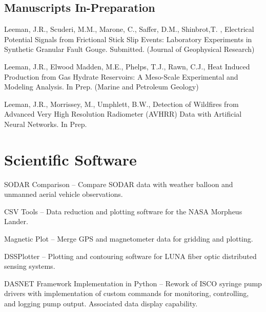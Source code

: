 \documentclass[letterpaper]{article}
\renewenvironment{itemize}{
  \begin{list}{}{
    \setlength{\leftmargin}{1.5em}
  }
}{
  \end{list}
}
\begin{document}
\subsection*{Manuscripts In-Preparation}
\begin{itemize}

\item Leeman, J.R., Scuderi, M.M., Marone, C., Saffer, D.M., Shinbrot,T. , Electrical Potential Signals from Frictional Stick Slip Events: Laboratory Experiments  in Synthetic Granular Fault Gouge. Submitted. (Journal of Geophysical Research)

\item Leeman, J.R., Elwood Madden, M.E., Phelps, T.J., Rawn, C.J., Heat Induced Production from Gas Hydrate Reservoirs: A Meso-Scale Experimental and Modeling Analysis.  In Prep. (Marine and Petroleum Geology)

\item Leeman, J.R., Morrissey, M., Umphlett, B.W., Detection of Wildfires from Advanced Very High Resolution Radiometer (AVHRR) Data with Artificial Neural Networks.  In Prep.
\end{itemize}


\section*{Scientific Software}
\begin{itemize}
\item SODAR Comparison --  Compare SODAR data with weather balloon and unmanned aerial vehicle observations.
\item CSV Tools -- Data reduction and plotting software for the NASA Morpheus Lander.
\item Magnetic Plot -- Merge GPS and magnetometer data for gridding and plotting.
\item DSSPlotter -- Plotting and contouring software for LUNA fiber optic distributed sensing systems.
\item DASNET Framework Implementation in Python -- Rework of ISCO syringe pump drivers with implementation of custom commands for monitoring, controlling, and logging pump output. Associated data display capability.
\end{itemize}
\end{document}
